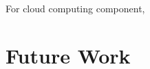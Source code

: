 \documentclass[a4paper,11pt]{article}
\begin{document}
For cloud computing component, 

\section{Future Work}



\small
\end{document}
